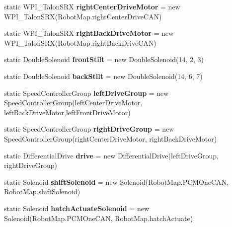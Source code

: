 \begin{DoxyCompactItemize}
static W\+P\+I\+\_\+\+Talon\+S\+RX {\bfseries right\+Center\+Drive\+Motor} = new W\+P\+I\+\_\+\+Talon\+S\+RX(Robot\+Map.\+right\+Center\+Drive\+C\+AN)
\item 
\mbox{\label{classfrc_1_1robot_1_1_o_i_a5f2937beffdc7dd1d937aaff36f20c1e}} 
static W\+P\+I\+\_\+\+Talon\+S\+RX {\bfseries right\+Back\+Drive\+Motor} = new W\+P\+I\+\_\+\+Talon\+S\+RX(Robot\+Map.\+right\+Back\+Drive\+C\+AN)
\item 
\mbox{\label{classfrc_1_1robot_1_1_o_i_a4f6b2dd823bad92cfaf2e9ecc7c0b1ca}} 
static Double\+Solenoid {\bfseries front\+Stilt} = new Double\+Solenoid(14, 2, 3)
\item 
\mbox{\label{classfrc_1_1robot_1_1_o_i_a89667abb08d7721a47088f0218fd5afa}} 
static Double\+Solenoid {\bfseries back\+Stilt} = new Double\+Solenoid(14, 6, 7)
\item 
\mbox{\label{classfrc_1_1robot_1_1_o_i_a6d76241e542ab271366e4cb4bf7b5133}} 
static Speed\+Controller\+Group {\bfseries left\+Drive\+Group} = new Speed\+Controller\+Group(left\+Center\+Drive\+Motor, left\+Back\+Drive\+Motor,left\+Front\+Drive\+Motor)
\item 
\mbox{\label{classfrc_1_1robot_1_1_o_i_a1595c2b8ebd7e4e467027b2eb21983ee}} 
static Speed\+Controller\+Group {\bfseries right\+Drive\+Group} = new Speed\+Controller\+Group(right\+Center\+Drive\+Motor, right\+Back\+Drive\+Motor)
\item 
\mbox{\label{classfrc_1_1robot_1_1_o_i_a8527ec31aa37a3ff523e5ba857aba46f}} 
static Differential\+Drive {\bfseries drive} = new Differential\+Drive(left\+Drive\+Group, right\+Drive\+Group)
\item 
\mbox{\label{classfrc_1_1robot_1_1_o_i_a63a56e8585378f6afe6f45facc98f494}} 
static Solenoid {\bfseries shift\+Solenoid} = new Solenoid(Robot\+Map.\+P\+C\+M\+One\+C\+AN, Robot\+Map.\+shift\+Solenoid)
\item 
\mbox{\label{classfrc_1_1robot_1_1_o_i_a232ad4f80d75cd3d48c2067251c59817}} 
static Solenoid {\bfseries hatch\+Actuate\+Solenoid} = new Solenoid(Robot\+Map.\+P\+C\+M\+One\+C\+AN, Robot\+Map.\+hatch\+Actuate)

\end{DoxyCompactItemize}
